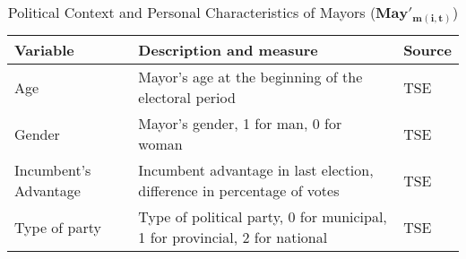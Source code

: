 \begin{table}[ht]
\caption{Political Context and Personal Characteristics of Mayors ($\mathbf{May'_{m(i,t)}}$)}
\centering
\begin{tabular}{l l l}
\hline\hline
Variable & Description and measure & Source \\ [0.5ex] 
\hline
Age & Mayor's age at the beginning of the electoral period  & TSE\\
Gender & Mayor's gender, 1 for man, 0 for woman  & TSE\\
Incumbent's Advantage & Incumbent advantage in last election, difference in percentage of votes & TSE\\
Type of party & Type of political party, 0 for municipal, 1 for provincial, 2 for national & TSE\\
\hline
\end{tabular}
\label{table:polmayor}
\end{table}



